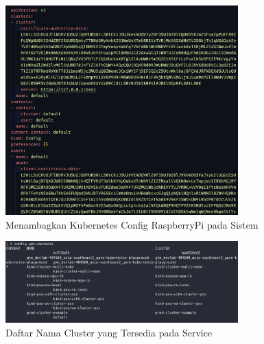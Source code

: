 \begin{figure}[ht]
  \centering
  \includegraphics[width=0.8\textwidth]{resources/chapter-4/pengujian/raspi-kube-config.jpg}
  \caption{Menambagkan Kubernetes Config RaspberryPi pada Sistem}
  \label{fig:raspi-add-kubeconfig}
\end{figure}

\begin{figure}[ht]
  \centering
  \includegraphics[width=0.8\textwidth]{resources/chapter-4/pengujian/p00.jpg}
  \caption{Daftar Nama Cluster yang Tersedia pada Service}
  \label{fig:list-cluster-tersedia}
\end{figure}


